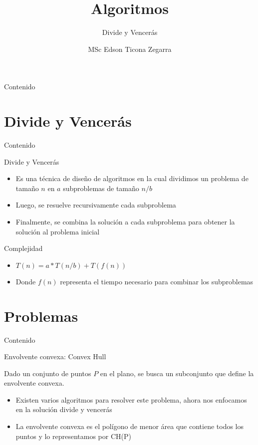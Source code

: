 \documentclass[]{beamer}
\title{Algoritmos}
\subtitle{Divide y Vencer\'as}
\author{MSc Edson Ticona Zegarra}
\institute{Campamento de Programaci\'on}
\date{}
\begin{document}
\maketitle

\begin{frame}{Contenido}
\tableofcontents
\end{frame}

\section{Divide y Vencer\'as}
\begin{frame}{Contenido}
\tableofcontents[currentsection]
\end{frame}

\begin{frame}{Divide y Vencer\'as}
  \begin{itemize}
    \item Es una t\'ecnica de dise\~no de algoritmos en la cual dividimos un problema de tama\~no $n$ en $a$ subproblemas de tama\~no $n/b$
      \pause
    \item Luego, se resuelve recursivamente cada subproblema
      \pause
    \item Finalmente, se combina la soluci\'on a cada subproblema para obtener la soluci\'on al problema inicial
  \end{itemize}
\end{frame}

\begin{frame}{Complejidad}
  \begin{itemize}
    \item $T(n) = a*T(n/b) + T(f(n))$
      \pause
    \item Donde $f(n)$ representa el tiempo necesario para combinar los subproblemas
  \end{itemize}
\end{frame}

\section{Problemas}
\begin{frame}{Contenido}
\tableofcontents[currentsection]
\end{frame}

\begin{frame}{Envolvente convexa: Convex Hull}
  \begin{definition}
    Dado un conjunto de puntos $P$ en el plano, se busca un subconjunto que define la envolvente convexa.
  \end{definition}
  \pause
  \begin{itemize}
    \item Existen varios algoritmos para resolver este problema, ahora nos enfocamos en la soluci\'on divide y vencer\'as
      \pause
    \item La envolvente convexa es el pol\'igono de menor \'area que contiene todos los puntos y lo representamos por CH(P)
  \end{itemize}
\end{frame}
\end{document}
